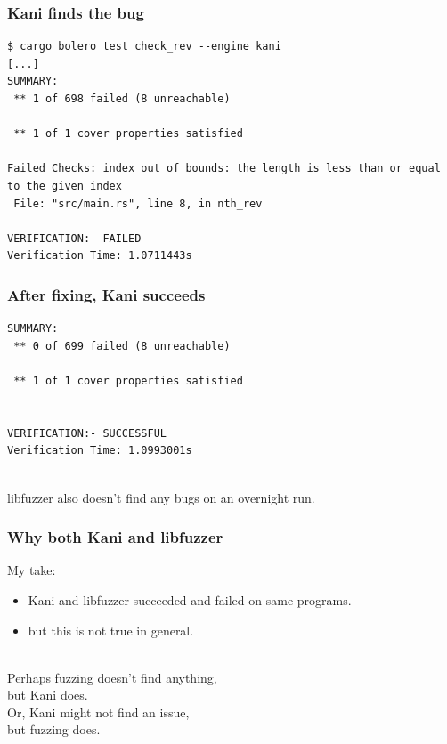 \documentclass{beamer}
\newenvironment{changemargin}[1]{%
  \begin{list}{}{%
    \setlength{\topsep}{0pt}%
    \setlength{\leftmargin}{#1}%
    \setlength{\rightmargin}{1em}
    \setlength{\listparindent}{\parindent}%
    \setlength{\itemindent}{\parindent}%
    \setlength{\parsep}{\parskip}%
  }%
  \item[]}{\end{list}}
\begin{document}
\begin{frame}[fragile]
  \frametitle{Kani finds the bug}
  \begin{changemargin}{1cm}
\scriptsize 
\begin{verbatim}
$ cargo bolero test check_rev --engine kani
[...]
SUMMARY:
 ** 1 of 698 failed (8 unreachable)

 ** 1 of 1 cover properties satisfied

Failed Checks: index out of bounds: the length is less than or equal to the given index
 File: "src/main.rs", line 8, in nth_rev

VERIFICATION:- FAILED
Verification Time: 1.0711443s
\end{verbatim}
  \end{changemargin}
\end{frame}

\begin{frame}[fragile]
  \frametitle{After fixing, Kani succeeds}
  \begin{changemargin}{1cm}
\scriptsize 
\begin{verbatim}
SUMMARY:
 ** 0 of 699 failed (8 unreachable)

 ** 1 of 1 cover properties satisfied


VERIFICATION:- SUCCESSFUL
Verification Time: 1.0993001s
\end{verbatim}

\Large ~ \\[1em]
libfuzzer also doesn't find any bugs on an overnight run.
  \end{changemargin}
\end{frame}

\begin{frame}[fragile]
  \frametitle{Why both Kani and libfuzzer}
  \begin{changemargin}{1cm}
    \Large
    My take:
    \begin{itemize}
    \item Kani and libfuzzer succeeded and failed on same programs.
      \item but this is not true in general.
    \end{itemize}
~\\
    Perhaps fuzzing doesn't find anything, \\ but Kani does.\\[1em]
    Or, Kani might not find an issue, \\
    but fuzzing does.
  \end{changemargin}
\end{frame}
\end{document}
